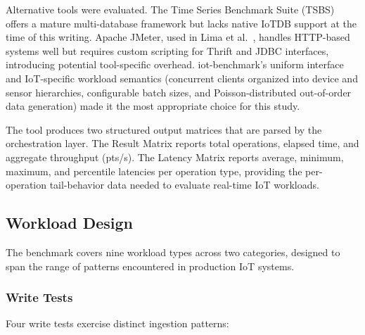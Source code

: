 Alternative tools were evaluated. The Time Series Benchmark Suite (TSBS) offers a mature
multi-database framework but lacks native IoTDB support at the time of this writing.
Apache JMeter, used in Lima et al.~\cite{lima2024avaliando}, handles HTTP-based systems well
but requires custom scripting for Thrift and JDBC interfaces, introducing potential tool-specific
overhead. iot-benchmark's uniform interface and IoT-specific workload semantics (concurrent clients
  organized into device and sensor hierarchies, configurable batch sizes, and
Poisson-distributed out-of-order data generation) made it the most appropriate choice
for this study.

The tool produces two structured output matrices that are parsed by the orchestration layer.
The Result Matrix reports total operations, elapsed time, and aggregate throughput (pts/s).
The Latency Matrix reports average, minimum, maximum, and percentile latencies per operation
type, providing the per-operation tail-behavior data needed to evaluate real-time IoT workloads.

\subsection{Workload Design}
\label{sec:workload}

The benchmark covers nine workload types across two categories, designed to span the range
of patterns encountered in production IoT systems.

\subsubsection{Write Tests}

Four write tests exercise distinct ingestion patterns:

